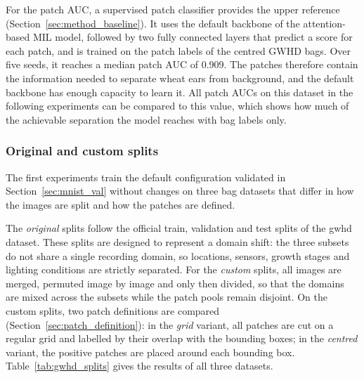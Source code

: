 \documentclass[12pt,parskip = half, DIV=classic,listof=totoc]{scrartcl}
\begin{document}
			For the patch AUC, a supervised patch classifier provides the upper reference
			(Section~\ref{sec:method_baseline}). %
			It uses the default backbone of the attention-based MIL model, followed by two fully
			connected layers that predict a score for each patch, and is trained on the patch
			labels of the centred GWHD bags. %
			Over five seeds, it reaches a median patch AUC of 0.909. The patches therefore
			contain the information needed to separate wheat ears from background, and the
			default backbone has enough capacity to learn it. All patch AUCs on this dataset in the 
			following experiments can be compared to this value, which shows how much of the achievable 
			separation the model reaches with bag labels only.

			\subsubsection{Original and custom splits}\label{sec:gwhd_new_splits}
 
				The first experiments train the default configuration validated in
				Section~\ref{sec:mnist_val} without changes on three bag datasets that differ in
				how the images are split and how the patches are defined.
				
				The \textit{original} splits follow the official train, validation and test
				splits of the \ac{gwhd} dataset. These splits are designed to represent a domain
				shift: the three subsets do not share a single recording domain, so locations,
				sensors, growth stages and lighting conditions are strictly separated. For the
				\textit{custom} splits, all images are merged, permuted image by image and only
				then divided, so that the domains are mixed across the subsets while the patch
				pools remain disjoint. On the custom splits, two patch definitions are compared
				(Section~\ref{sec:patch_definition}): in the \textit{grid} variant, all patches
				are cut on a regular grid and labelled by their overlap with the bounding boxes;
				in the \textit{centred} variant, the positive patches are placed around each
				bounding box. Table~\ref{tab:gwhd_splits} gives the results of all three
				datasets.
				
\end{document}
